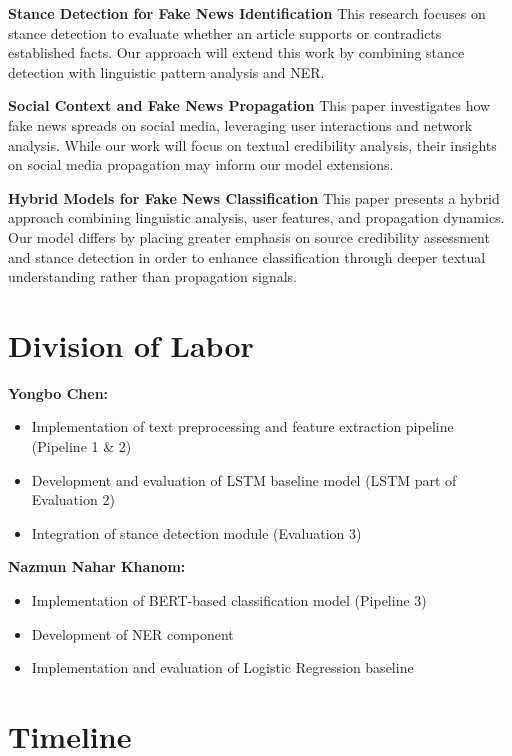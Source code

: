 \documentclass[11pt,a4paper]{article}
\begin{document}
\textbf{Stance Detection for Fake News Identification} \cite{li2022brief}
This research focuses on stance detection to evaluate whether an article supports or contradicts established facts. 
Our approach will extend this work by combining stance detection with linguistic pattern analysis and NER.

\textbf{Social Context and Fake News Propagation} \cite{chen2025enhancing}
This paper investigates how fake news spreads on social media, leveraging user interactions and network analysis. 
While our work will focus on textual credibility analysis, their insights on social media propagation may inform our model extensions.

\textbf{Hybrid Models for Fake News Classification} \cite{mostafa2024modality}
This paper presents a hybrid approach combining linguistic analysis, user features, and propagation dynamics. 
Our model differs by placing greater emphasis on source credibility assessment and stance detection in order to enhance classification through deeper textual understanding rather than propagation signals.

\section{Division of Labor}

\noindent\textbf{Yongbo Chen:}
\begin{itemize}[noitemsep,topsep=0pt]
    \item Implementation of text preprocessing and feature extraction pipeline (Pipeline 1 \& 2)
    \item Development and evaluation of LSTM baseline model (LSTM part of Evaluation 2)
    \item Integration of stance detection module (Evaluation 3)
\end{itemize}

\noindent\textbf{Nazmun Nahar Khanom:}
\begin{itemize}[noitemsep,topsep=0pt]
    \item Implementation of BERT-based classification model (Pipeline 3)
    \item Development of NER component
    \item Implementation and evaluation of Logistic Regression baseline
\end{itemize}

\section{Timeline}
\end{document}
